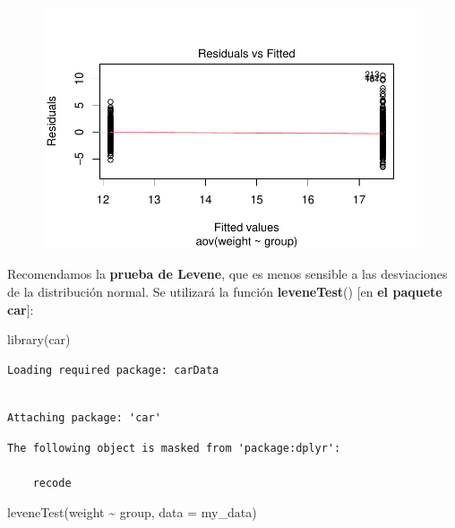 \documentclass[
  letterpaper,
  DIV=11,
  numbers=noendperiod]{scrartcl}
\newenvironment{Shaded}{\begin{snugshade}}{\end{snugshade}}
\newcommand{\AttributeTok}[1]{\textcolor[rgb]{0.40,0.45,0.13}{#1}}
\newcommand{\FunctionTok}[1]{\textcolor[rgb]{0.28,0.35,0.67}{#1}}
\newcommand{\NormalTok}[1]{\textcolor[rgb]{0.00,0.23,0.31}{#1}}
\newcommand{\SpecialCharTok}[1]{\textcolor[rgb]{0.37,0.37,0.37}{#1}}
\begin{document}
\begin{figure}[H]

{\centering \includegraphics{ANOVA_files/figure-pdf/unnamed-chunk-10-1.pdf}

}

\end{figure}

Recomendamos la \textbf{prueba de Levene}, que es menos sensible a las
desviaciones de la distribución normal. Se utilizará la función
\textbf{leveneTest}() {[}en \textbf{el paquete car}{]}:

\begin{Shaded}
\begin{Highlighting}[]
\FunctionTok{library}\NormalTok{(car)}
\end{Highlighting}
\end{Shaded}

\begin{verbatim}
Loading required package: carData
\end{verbatim}

\begin{verbatim}

Attaching package: 'car'
\end{verbatim}

\begin{verbatim}
The following object is masked from 'package:dplyr':

    recode
\end{verbatim}

\begin{Shaded}
\begin{Highlighting}[]
\FunctionTok{leveneTest}\NormalTok{(weight }\SpecialCharTok{\textasciitilde{}}\NormalTok{ group, }\AttributeTok{data =}\NormalTok{ my\_data)}
\end{Highlighting}
\end{Shaded}
\end{document}
